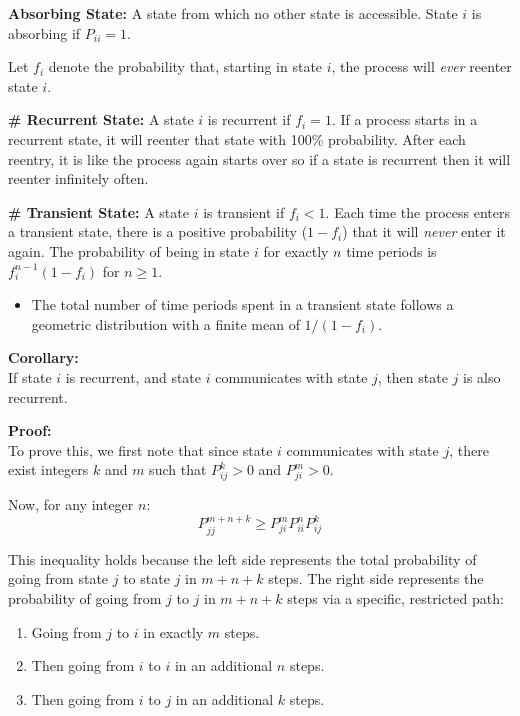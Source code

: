 \textbf{Absorbing State:} A state from which no other state is accessible. State $i$ is absorbing if $P_{ii} = 1$.

\vspace{2cm}

Let $f_i$ denote the probability that, starting in state $i$, the process will \textit{ever} reenter state $i$.

\textbf{\textcolor{primary}{\# Recurrent State:}} A state $i$ is recurrent if $f_i = 1$. If a process starts in a recurrent state, it will reenter that state with 100\% probability. After each reentry, it is like the process again starts over so if a state is recurrent then it will reenter infinitely often.

\textbf{\textcolor{primary}{\# Transient State:}} A state $i$ is transient if $f_i < 1$. Each time the process enters a transient state, there is a positive probability ($1 - f_i$) that it will \textit{never} enter it again. The probability of being in state $i$ for exactly $n$ time periods is $f_i^{n-1}(1 - f_i)$ for $n \ge 1$.
\begin{itemize}
    \item The total number of time periods spent in a transient state follows a geometric distribution with a finite mean of $1/(1 - f_i)$.
\end{itemize}

\vspace{0.3cm}
\textbf{Corollary:} \\
If state $i$ is recurrent, and state $i$ communicates with state $j$, then state $j$ is also recurrent.

\textbf{Proof:} \\
To prove this, we first note that since state $i$ communicates with state $j$, there exist integers $k$ and $m$ such that $P_{ij}^k > 0$ and $P_{ji}^m > 0$.

Now, for any integer $n$:
\[ P_{jj}^{m+n+k} \ge P_{ji}^m P_{ii}^n P_{ij}^k \]

This inequality holds because the left side represents the total probability of going from state $j$ to state $j$ in $m + n + k$ steps. The right side represents the probability of going from $j$ to $j$ in $m + n + k$ steps via a specific, restricted path:
\begin{enumerate}
    \item Going from $j$ to $i$ in exactly $m$ steps.
    \item Then going from $i$ to $i$ in an additional $n$ steps.
    \item Then going from $i$ to $j$ in an additional $k$ steps.
\end{enumerate}

